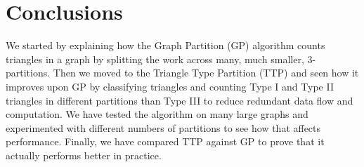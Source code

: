 \documentclass[paper=a4, fontsize=11pt]{scrartcl}
\begin{document}
\section{Conclusions}
We started by explaining how the Graph Partition (GP) algorithm counts triangles
in a graph by splitting the work across many, much smaller, 3-partitions. Then
we moved to the Triangle Type Partition (TTP) and seen how it improves upon GP
by classifying triangles and counting Type I and Type II triangles in different
partitions than Type III to reduce redundant data flow and computation. We have
tested the algorithm on many large graphs and experimented with different
numbers of partitions to see how that affects performance. Finally, we have
compared TTP against GP to prove that it actually performs better in practice.



\end{document}
